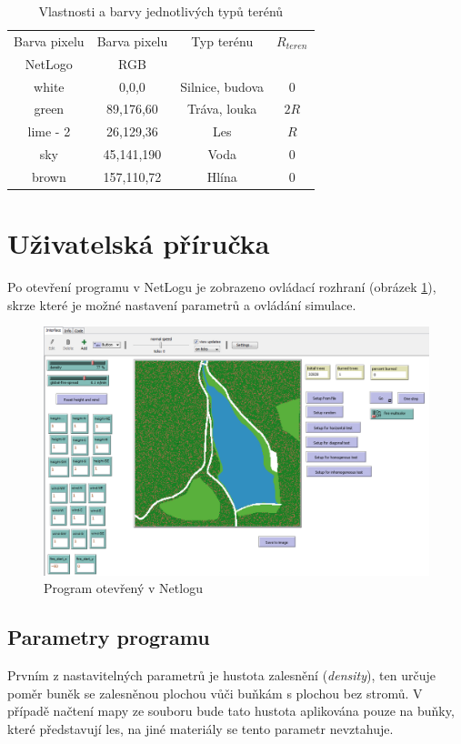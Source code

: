 \documentclass[11pt,a4paper]{scrartcl}
\begin{document}
	\begin{table}[H]
		\centering
		\begin{tabular}{|c|c|c|c|}
		\hline
		Barva pixelu & Barva pixelu & Typ terénu & $R_{teren}$ \\
		NetLogo & RGB & & \\
		\hline
		\hline
		white & 0,0,0 & Silnice, budova & 0 \\
		\hline
		green & 89,176,60 & Tráva, louka & $2R$ \\
		\hline 
		lime - 2 &  26,129,36 & Les & $R$ \\
		\hline
		sky & 45,141,190 & Voda & 0 \\
		\hline
		brown & 157,110,72 & Hlína & 0 \\
		\hline
		\end{tabular}
		\caption{Vlastnosti a barvy jednotlivých typů terénů}
		\label{tab:terrain-types}
	\end{table}
	
	
	\section{Uživatelská příručka}
	Po otevření programu v NetLogu je zobrazeno ovládací rozhraní (obrázek \ref{fig:netlog-interface}), skrze které je možné nastavení parametrů a ovládání simulace.
	
	\begin{figure}[H]
		\centering
		\includegraphics[width=14.5cm]{interface}
		\caption{Program otevřený v Netlogu}
		\label{fig:netlog-interface}
	\end{figure}
	
	\subsection{Parametry programu}
	Prvním z nastavitelných parametrů je hustota zalesnění (\textit{density}), ten určuje poměr buněk se zalesněnou plochou vůči buňkám s plochou bez stromů. V případě načtení mapy ze souboru bude tato hustota aplikována pouze na buňky, které představují les, na jiné materiály se tento parametr nevztahuje.
	
\end{document}

